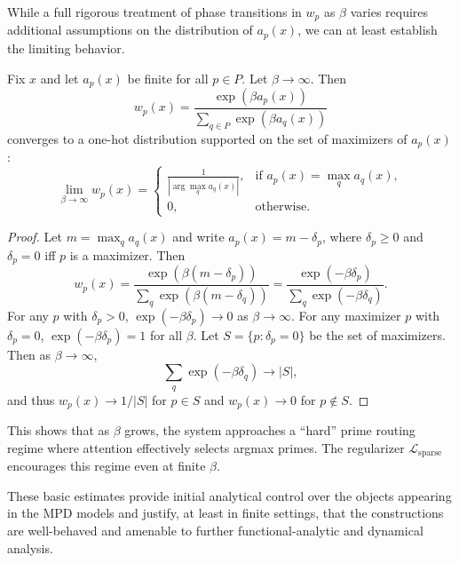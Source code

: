 \documentclass[11pt]{article}
\begin{document}
While a full rigorous treatment of phase transitions in $w_p$ as $\beta$ varies requires additional assumptions on the distribution of $a_p(x)$, we can at least establish the limiting behavior.

\begin{proposition}
\label{prop:ZeroTemp}
Fix $x$ and let $a_p(x)$ be finite for all $p\in P$. Let $\beta\to\infty$. Then
\[
w_p(x) = \frac{\exp(\beta a_p(x))}{\sum_{q\in P} \exp(\beta a_q(x))}
\]
converges to a one-hot distribution supported on the set of maximizers of $a_p(x)$:
\[
\lim_{\beta\to\infty} w_p(x) =
\begin{cases}
\frac{1}{|\arg\max_q a_q(x)|}, &\text{if } a_p(x) = \max_q a_q(x),\\
0, &\text{otherwise.}
\end{cases}
\]
\end{proposition}

\begin{proof}
Let $m = \max_q a_q(x)$ and write $a_p(x) = m - \delta_p$, where $\delta_p\ge 0$ and $\delta_p=0$ iff $p$ is a maximizer. Then
\[
w_p(x) = \frac{\exp(\beta (m - \delta_p))}{\sum_q \exp(\beta (m - \delta_q))}
= \frac{\exp(-\beta \delta_p)}{\sum_q \exp(-\beta \delta_q)}.
\]
For any $p$ with $\delta_p>0$, $\exp(-\beta \delta_p)\to 0$ as $\beta\to\infty$. For any maximizer $p$ with $\delta_p=0$, $\exp(-\beta \delta_p)=1$ for all $\beta$. Let $S = \{p:\delta_p=0\}$ be the set of maximizers. Then as $\beta\to\infty$,
\[
\sum_q \exp(-\beta\delta_q) \to |S|,
\]
and thus $w_p(x)\to 1/|S|$ for $p\in S$ and $w_p(x)\to 0$ for $p\notin S$.
\end{proof}

This shows that as $\beta$ grows, the system approaches a ``hard'' prime routing regime where attention effectively selects argmax primes. The regularizer $\mathcal{L}_{\mathrm{sparse}}$ encourages this regime even at finite $\beta$.

\bigskip

These basic estimates provide initial analytical control over the objects appearing in the MPD models and justify, at least in finite settings, that the constructions are well-behaved and amenable to further functional-analytic and dynamical analysis.

\nocite{*}


\end{document}
